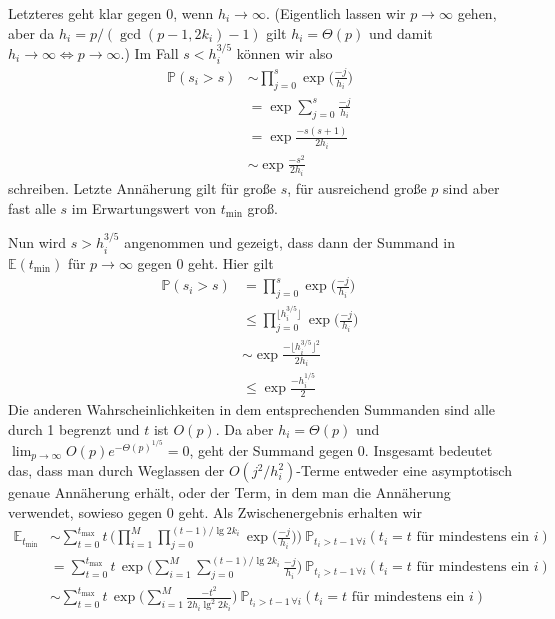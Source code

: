 \documentclass[a4paper, 10pt, ngerman]{article}
\newcommand{\E}{\mathbb{E}}
\renewcommand{\P}{\mathbb{P}}
\begin{document}
Letzteres geht klar gegen 0, wenn $h_i \to \infty$. (Eigentlich lassen wir $p \to \infty$ gehen, aber da $h_i = p/(\gcd(p - 1, 2k_i) - 1)$ gilt $h_i = \Theta(p)$ und damit $h_i \to \infty \Longleftrightarrow p \to \infty$.) Im Fall $s < h_i^{3/5}$ können wir also
\begin{align*}
    \P(s_i > s)
     & \sim \prod_{j = 0}^{s} \exp \bigg ( \frac {-j}{h_i} \bigg ) \\
     & =\exp \sum_{j = 0}^{s} \frac {-j} {h_i}                     \\
     & = \exp \frac {-s (s + 1)} {2h_i}                            \\
     & \sim \exp \frac {-s^2} {2h_i}
\end{align*}
schreiben. Letzte Annäherung gilt für große $s$, für ausreichend große $p$ sind aber fast alle $s$ im Erwartungswert von $t_{\min}$ groß.

Nun wird $s > h_i^{3/5}$ angenommen und gezeigt, dass dann der Summand in $\E(t_{\min})$ für $p \to \infty$ gegen 0 geht. Hier gilt
\begin{align*}
    \P(s_i > s)
     & = \prod_{j = 0}^{s} \exp \bigg ( \frac {-j}{h_i} \bigg )                                     \\
     & \le \prod_{j = 0}^{\big \lfloor h_i^{3/5} \big \rfloor} \exp \bigg ( \frac {-j}{h_i} \bigg ) \\
     & \sim \exp \frac {- \Big \lfloor h_i^{3/5} \Big \rfloor^2 } {2h_i}                            \\
     & \le \exp \frac {- h_i^{1/5}} {2}
\end{align*}
Die anderen Wahrscheinlichkeiten in dem entsprechenden Summanden sind alle durch 1 begrenzt und $t$ ist $O(p)$. Da aber $h_i = \Theta(p)$ und $\lim_{p \to \infty} O(p) e^{-\Theta(p)^{1/5}} = 0$, geht der Summand gegen 0. Insgesamt bedeutet das, dass man durch Weglassen der $O(j^2/h_i^2)$-Terme entweder eine asymptotisch genaue Annäherung erhält, oder der Term, in dem man die Annäherung verwendet, sowieso gegen 0 geht. Als Zwischenergebnis erhalten wir
\begin{align}
    \E_{t_{\min}}
     & \sim \sum_{t = 0}^{t_{\max}} t \, \Bigg ( \prod_{i = 1}^M \prod_{j = 0}^{(t-1) / \lg 2k_i} \exp \bigg ( \frac {-j}{h_i} \bigg ) \Bigg ) \ \P_{t_i > t - 1 \, \forall i}(t_i = t \text{ für mindestens ein } i) \nonumber \\
     & = \sum_{t = 0}^{t_{\max}} t \, \exp \Bigg ( \sum_{i = 1}^M \sum_{j = 0}^{(t-1) / \lg 2k_i}  \frac {-j}{h_i} \Bigg ) \ \P_{t_i > t - 1 \, \forall i}(t_i = t \text{ für mindestens ein } i) \nonumber                     \\
     & \sim \sum_{t = 0}^{t_{\max}} t \, \exp \Bigg ( \sum_{i = 1}^M \frac {-t^2} {2 h_i \lg^2 2k_i} \Bigg ) \ \P_{t_i > t - 1 \, \forall i}(t_i = t \text{ für mindestens ein } i) \label{expectation-tmin-intermed}
\end{align}
\end{document}
